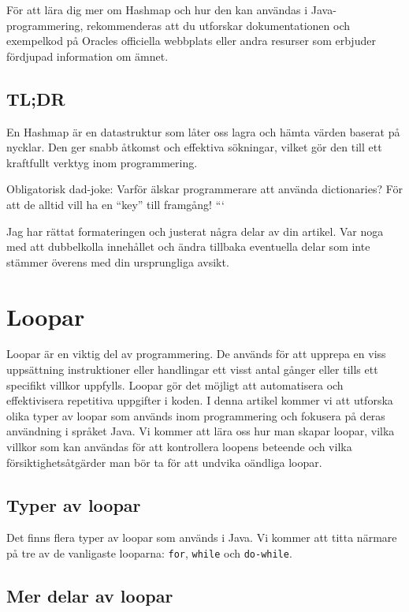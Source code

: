 För att lära dig mer om Hashmap och hur den kan användas i
Java-programmering, rekommenderas att du utforskar dokumentationen och
exempelkod på Oracles officiella webbplats eller andra resurser som
erbjuder fördjupad information om ämnet.

\hypertarget{tldr}{%
\subsection{TL;DR}\label{tldr}}

En Hashmap är en datastruktur som låter oss lagra och hämta värden
baserat på nycklar. Den ger snabb åtkomst och effektiva sökningar,
vilket gör den till ett kraftfullt verktyg inom programmering.

Obligatorisk dad-joke: Varför älskar programmerare att använda
dictionaries? För att de alltid vill ha en ``key'' till framgång! ```

Jag har rättat formateringen och justerat några delar av din artikel.
Var noga med att dubbelkolla innehållet och ändra tillbaka eventuella
delar som inte stämmer överens med din ursprungliga avsikt.

\hypertarget{loopar}{%
\section{Loopar}\label{loopar}}

Loopar är en viktig del av programmering. De används för att upprepa en
viss uppsättning instruktioner eller handlingar ett visst antal gånger
eller tills ett specifikt villkor uppfylls. Loopar gör det möjligt att
automatisera och effektivisera repetitiva uppgifter i koden. I denna
artikel kommer vi att utforska olika typer av loopar som används inom
programmering och fokusera på deras användning i språket Java. Vi kommer
att lära oss hur man skapar loopar, vilka villkor som kan användas för
att kontrollera loopens beteende och vilka försiktighetsåtgärder man bör
ta för att undvika oändliga loopar.

\hypertarget{typer-av-loopar}{%
\subsection{Typer av loopar}\label{typer-av-loopar}}

Det finns flera typer av loopar som används i Java. Vi kommer att titta
närmare på tre av de vanligaste looparna: \texttt{for}, \texttt{while}
och \texttt{do-while}.

\hypertarget{mer-delar-av-loopar}{%
\subsection{Mer delar av loopar}\label{mer-delar-av-loopar}}

